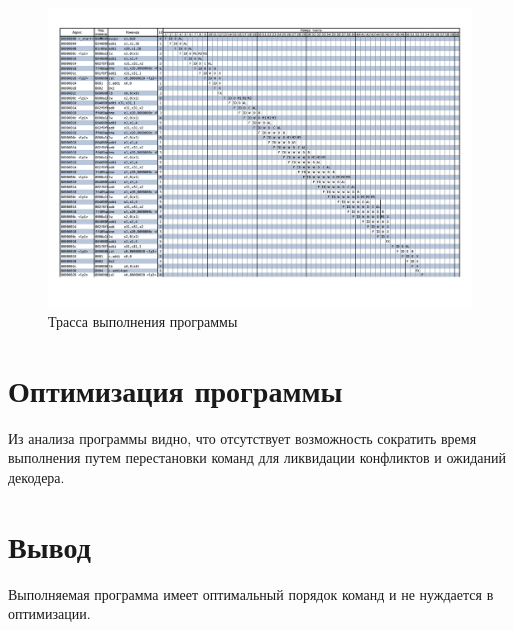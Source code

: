 \begin{figure}[h]
	\centering
	\includegraphics[width = \linewidth]{img/not_opt.png}
	\caption{Трасса выполнения программы}
	\label{not_opt}
\end{figure}

\section{Оптимизация программы}
Из анализа программы видно, что отсутствует возможность сократить время выполнения путем перестановки команд для ликвидации конфликтов и ожиданий декодера.

\section*{Вывод}
Выполняемая программа имеет оптимальный порядок команд и не нуждается в оптимизации. 

